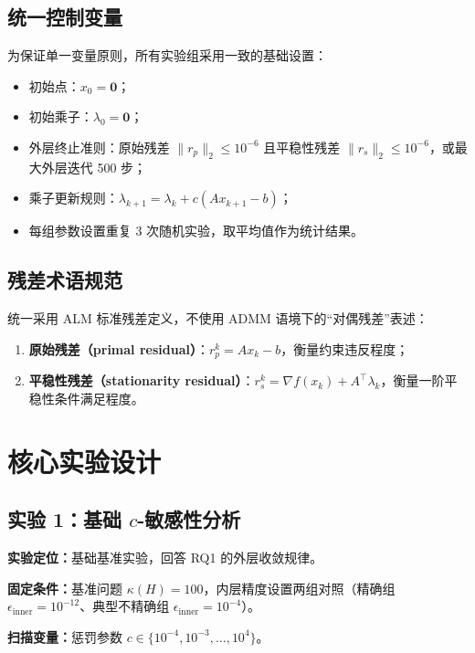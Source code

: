 \documentclass[UTF8]{ctexart}
\numberwithin{figure}{section}
\theoremstyle{definition}
\theoremstyle{examplestyle}
\theoremstyle{remark}
\begin{document}
\subsection{统一控制变量}
\label{sec:controls}

为保证单一变量原则，所有实验组采用一致的基础设置：
\begin{itemize}
\item 初始点：$x_0=\boldsymbol{0}$；
\item 初始乘子：$\lambda_0=\boldsymbol{0}$；
\item 外层终止准则：原始残差 $\|r_p\|_2\le10^{-6}$ 且平稳性残差 $\|r_s\|_2\le10^{-6}$，或最大外层迭代 500 步；
\item 乘子更新规则：$\lambda_{k+1}=\lambda_k+c(Ax_{k+1}-b)$；
\item 每组参数设置重复 3 次随机实验，取平均值作为统计结果。
\end{itemize}

\subsection{残差术语规范}
\label{sec:residuals}

统一采用 ALM 标准残差定义，不使用 ADMM 语境下的“对偶残差”表述：
\begin{enumerate}
\item \textbf{原始残差（primal residual）}：$r_p^k=Ax_k-b$，衡量约束违反程度；
\item \textbf{平稳性残差（stationarity residual）}：$r_s^k=\nabla f(x_k)+A^\top\lambda_k$，衡量一阶平稳性条件满足程度。
\end{enumerate}

\section{核心实验设计}
\label{sec:experiments}

\subsection{实验 1：基础 $c$-敏感性分析}
\label{sec:exp1}

\textbf{实验定位：}基础基准实验，回答 RQ1 的外层收敛规律。

\textbf{固定条件：}基准问题 $\kappa(H)=100$，内层精度设置两组对照（精确组 $\epsilon_{\mathrm{inner}}=10^{-12}$、典型不精确组 $\epsilon_{\mathrm{inner}}=10^{-4}$）。

\textbf{扫描变量：}惩罚参数 $c\in\{10^{-4},10^{-3},\dots,10^{4}\}$。
\end{document}
